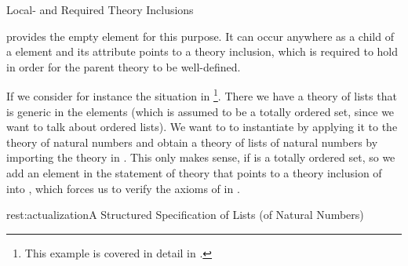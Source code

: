 \begin{omgroup}[id=complex-theories,short=Complex Theories,
                            creators=miko,contributors=frabe]
\begin{omgroup}[id=restricting-inference,short=Local/Required Theory Inclusions]{Local- and
  Required Theory Inclusions}
\begin{module}[id=restinf]
\begin{definition}[id=inclusion.def] 
  \omdoc provides the empty {} element for this purpose. It can occur
  anywhere as a child of a  element and its 
  attribute points to a theory inclusion, which is required to hold in order for the
  parent theory to be well-defined.
\end{definition}  

If we consider for instance the situation in {}\footnote{This
  example is covered in detail in {}.}.  There we have a theory
{} of lists that is generic in the elements (which is assumed to be a
totally ordered set, since we want to talk about ordered lists). We want to to instantiate
{} by applying it to the theory {} of natural numbers and
obtain a theory {} of lists of natural numbers by importing the theory
{} in {}. This only makes sense, if
{} is a totally ordered set, so we add an  element in
the statement of theory {} that points to a theory inclusion of
{} into {}, which forces us to verify the axioms of
{} in {}.

\begin{myfig}{rest:actualization}{A Structured Specification of Lists (of
    Natural Numbers)}
  \quad
\end{myfig}


\end{module}
\end{omgroup}
\end{omgroup}
